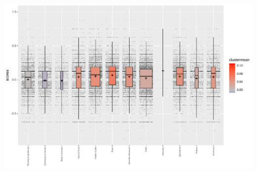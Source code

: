 \documentclass{tum-presentation}
\begin{document}
\begin{frame}
\begin{columns}
\begin{minipage}[c]{\linewidth}
        \centering
        \includegraphics[width=\linewidth]{figures/all_boxplot_all_sentiments_nytimes_comments.pdf}
    
      \end{minipage}
\end{columns}
\end{frame}
\end{document}
